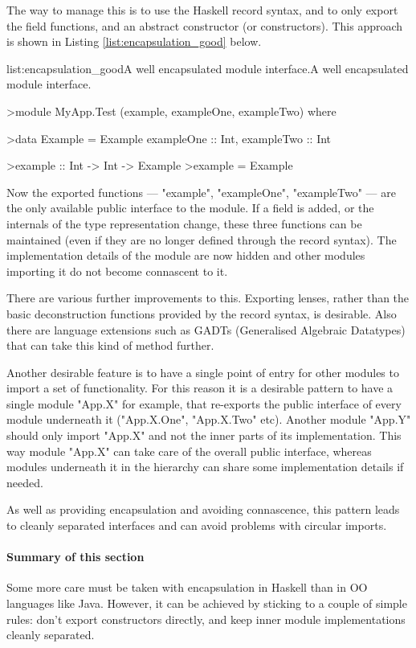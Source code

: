 The way to manage this is to use the Haskell record syntax, and to only export the field functions, and an abstract constructor (or constructors). This approach is shown in Listing \ref{list:encapsulation_good} below.

\vspace{-0.5em}
\begin{listing}{list:encapsulation_good}{A well encapsulated module interface.}{A well encapsulated module interface.}{}
\end{listing}\vspace{-1.5em}

\begin{haskell}
>module MyApp.Test (example, exampleOne, exampleTwo) where

>data Example = Example { exampleOne :: Int, exampleTwo :: Int }

>example :: Int -> Int -> Example
>example = Example

\end{haskell}
\noindent
Now the exported functions --- "example", "exampleOne", "exampleTwo" --- are the only available public interface to the module. If a field is added, or the internals of the type representation change, these three functions can be maintained (even if they are no longer defined through the record syntax). The implementation details of the module are now hidden and other modules importing it do not become connascent to it.

There are various further improvements to this. Exporting lenses, rather than the basic deconstruction functions provided by the record syntax, is desirable. Also there are language extensions such as GADTs (Generalised Algebraic Datatypes) that can take this kind of method further.

Another desirable feature is to have a single point of entry for other modules to import a set of functionality. For this reason it is a desirable pattern to have a single module "App.X" for example, that re-exports the public interface of every module underneath it ("App.X.One", "App.X.Two" etc). Another module "App.Y" should only import "App.X" and not the inner parts of its implementation. This way module "App.X" can take care of the overall public interface, whereas modules underneath it in the hierarchy can share some implementation details if needed.

As well as providing encapsulation and avoiding connascence, this pattern leads to cleanly separated interfaces and can avoid problems with circular imports. 

\paragraph{Summary of this section} Some more care must be taken with encapsulation in Haskell than in OO languages like Java. However, it can be achieved by sticking to a couple of simple rules: don't export constructors directly, and keep inner module implementations cleanly separated.
